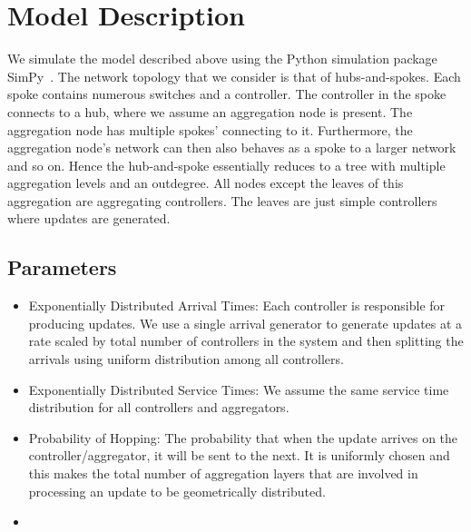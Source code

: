\documentclass[conference]{IEEEtran}
\begin{document}


\section{Model Description}
We simulate the model described above using the Python simulation package SimPy~\cite{simpy}. The network topology that we consider is that of hubs-and-spokes. Each spoke contains numerous switches and a controller. The controller in the spoke connects to a hub, where we assume an aggregation node is present. The aggregation node has multiple spokes' connecting to it. Furthermore, the aggregation node's network can then also behaves as a spoke to a larger network and so on. Hence the hub-and-spoke essentially reduces to a tree with multiple aggregation levels and an outdegree. All nodes except the leaves of this aggregation are aggregating controllers. The leaves are just simple controllers where updates are generated. 

\subsection{Parameters}
\begin{itemize}
 \item Exponentially Distributed Arrival Times: Each controller is responsible for producing updates. We use a single arrival generator to generate updates at a rate scaled by total number of controllers in the system and then splitting the arrivals using uniform distribution among all controllers.
 \item Exponentially Distributed Service Times: We assume the same service time distribution for all controllers and aggregators. 
 \item Probability of Hopping: The probability that when the update arrives on the controller/aggregator, it will be sent to the next. It is uniformly chosen and this makes the total number of aggregation layers that are involved in processing an update to be geometrically distributed.
 \item 
 
 \end{itemize}
\end{document}
